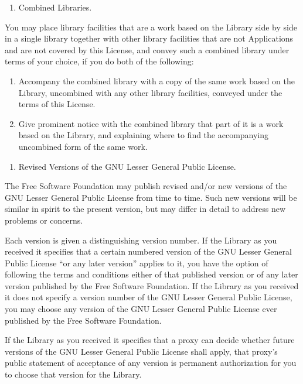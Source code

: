 \begin{enumerate}
\def\labelenumi{\arabic{enumi}.}
\setcounter{enumi}{4}
\tightlist
\item
  Combined Libraries.
\end{enumerate}

You may place library facilities that are a work based on the Library
side by side in a single library together with other library facilities
that are not Applications and are not covered by this License, and
convey such a combined library under terms of your choice, if you do
both of the following:

\begin{enumerate}
\def\labelenumi{\alph{enumi}.}
\item
  Accompany the combined library with a copy of the same work based on
  the Library, uncombined with any other library facilities, conveyed
  under the terms of this License.
\item
  Give prominent notice with the combined library that part of it is a
  work based on the Library, and explaining where to find the
  accompanying uncombined form of the same work.
\end{enumerate}

\begin{enumerate}
\def\labelenumi{\arabic{enumi}.}
\setcounter{enumi}{5}
\tightlist
\item
  Revised Versions of the GNU Lesser General Public License.
\end{enumerate}

The Free Software Foundation may publish revised and/or new versions of
the GNU Lesser General Public License from time to time. Such new
versions will be similar in spirit to the present version, but may
differ in detail to address new problems or concerns.

Each version is given a distinguishing version number. If the Library as
you received it specifies that a certain numbered version of the GNU
Lesser General Public License ``or any later version'' applies to it,
you have the option of following the terms and conditions either of that
published version or of any later version published by the Free Software
Foundation. If the Library as you received it does not specify a version
number of the GNU Lesser General Public License, you may choose any
version of the GNU Lesser General Public License ever published by the
Free Software Foundation.

If the Library as you received it specifies that a proxy can decide
whether future versions of the GNU Lesser General Public License shall
apply, that proxy's public statement of acceptance of any version is
permanent authorization for you to choose that version for the Library.
